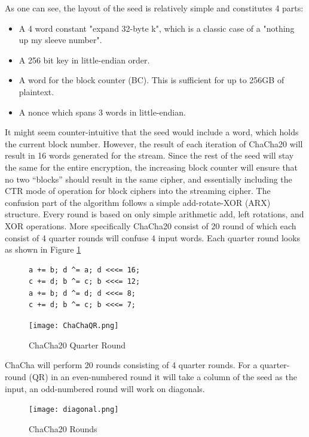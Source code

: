 \documentclass[a4paper, openany]{book}
\begin{document}
\begin{abstact}
As one can see, the layout of the seed is relatively simple and constitutes 4 parts:
\begin{itemize}
\itemsep 0em
\item A 4 word constant "expand 32-byte k", which is a classic case of a "nothing up my sleeve number".
\item A 256 bit key in little-endian order.
\item A word for the block counter (BC). This is sufficient for up to 256GB of plaintext.
\item A nonce which spans 3 words in little-endian.
\end{itemize}
It might seem counter-intuitive that the seed would include a word, which holds the current block number. However, the result of each iteration of ChaCha20 will result in 16 words generated for the stream. Since the rest of the seed will stay the same for the entire encryption, the increasing block counter will ensure that no two ``blocks'' should result in the same cipher, and essentially including the CTR mode of operation for block ciphers into the streaming cipher. The confusion part of the algorithm follows a simple add-rotate-XOR (ARX) structure. Every round is based on only simple arithmetic add, left rotations, and XOR operations. More specifically ChaCha20 consist of 20 round of which each consist of 4 quarter rounds will confuse 4 input words. Each quarter round looks as shown in Figure \ref{fig:ChaChaQR}
\begin{figure}[H]
\begin{minipage}{0.4\textwidth}
\begin{verbatim}
a += b; d ^= a; d <<<= 16;
c += d; b ^= c; b <<<= 12;
a += b; d ^= d; d <<<= 8;
c += d; b ^= c; b <<<= 7;
\end{verbatim}
\end{minipage}
\qquad
\begin{minipage}{0.4\textwidth}
\texttt{[image: ChaChaQR.png]}
\end{minipage}
\caption{ChaCha20 Quarter Round}
\label{fig:ChaChaQR}
\end{figure}
ChaCha will perform 20 rounds consisting of 4 quarter rounds. For a quarter-round (QR) in an even-numbered round it will take a column of the seed as the input, an odd-numbered round will work on diagonals.
\begin{figure}[H]
\centering
\texttt{[image: diagonal.png]}
\caption{ChaCha20 Rounds}
\label{fig:ChaChaRound}
\end{figure}


\end{abstact}
\end{document}
